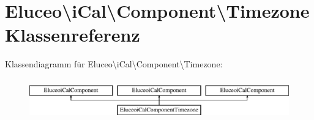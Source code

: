 \hypertarget{class_eluceo_1_1i_cal_1_1_component_1_1_timezone}{}\section{Eluceo\textbackslash{}i\+Cal\textbackslash{}Component\textbackslash{}Timezone Klassenreferenz}
\label{class_eluceo_1_1i_cal_1_1_component_1_1_timezone}
Klassendiagramm für Eluceo\textbackslash{}i\+Cal\textbackslash{}Component\textbackslash{}Timezone\+:\begin{figure}[H]
\begin{center}
\leavevmode
\includegraphics[height=1.786284cm]{class_eluceo_1_1i_cal_1_1_component_1_1_timezone}
\end{center}
\end{figure}
